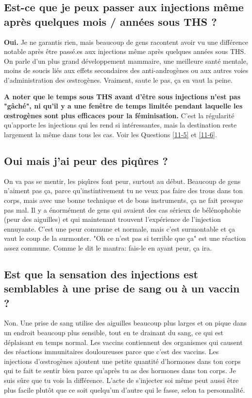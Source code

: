 \documentclass{article}
\begin{document}
\subsection{Est-ce que je peux passer aux injections même après quelques mois / années sous THS ?}

\textbf{Oui.} Je ne garantis rien, mais beaucoup de gens racontent avoir vu une différence notable après être passé.es aux injections même après quelques années sous THS. On parle d'un plus grand développement mammaire, une meilleure santé mentale, moins de soucis liés aux effets secondaires des anti-androgènes ou aux autres voies d'administration des œstrogènes. Vraiment, saute le pas, ça en vaut la peine.

\textbf{A noter que le temps sous THS avant d'être sous injections n'est pas "gâché", ni qu'il y a une fenêtre de temps limitée pendant laquelle les œstrogènes sont plus efficaces pour la féminisation.} C'est la régularité qu'apporte les injections qui les rend si intéressantes, mais la destination reste largement la même dans tous les cas. Voir les Questions \ref{11-5} et \ref{11-6}. 

\subsection{Oui mais j'ai peur des piqûres ?}

On va pas se mentir, les piqûres font peur, surtout au début. Beaucoup de gens n'aiment pas ça, parce qu'instintivement tu ne veux pas faire des trous dans ton corps, mais avec une bonne technique et de bons instruments, ça ne fait presque pas mal. Il y a énormément de gens qui avaient des cas sérieux de bélénophobie (peur des aiguilles) et qui maintenant trouvent l'expérience de l'injection ennuyante. C'est une peur commune et normale, mais c'est surmontable et ça vaut le coup de la surmonter. "Oh ce n'est pas si terrible que ça" est une réaction assez commune. Comme le dit le mantra: fais-le en ayant peur, ça ira. 

\subsection{Est que la sensation des injections est semblables à une prise de sang ou à un vaccin ?}

Non. Une prise de sang utilise des aiguilles beaucoup plus larges et on pique dans un endroit beaucoup plus sensible, tout en te drainant du sang, ce qui est déplaisant en temps normal. Les vaccins contiennent des organismes qui causent des réactions immunitaires douloureuses parce que c'est des vaccins. Les injections d'œstrogènes ajoutent une petite quantité d'hormones dans ton corps qui te fait te sentir bien parce qu'après tu as des hormones dans ton corps. Je suis sûre que tu vois la différence. L'acte de s'injecter soi même peut aussi être plus facile plutôt que ce soit quelqu'un d'autre qui le fasse, selon ta personnalité.
\end{document}

